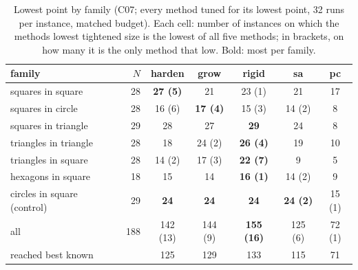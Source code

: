 \begin{table}[t]\centering\small
\begin{tabular}{lrccccc}
\toprule
family & $N$ & \textbf{harden} & \textbf{grow} & \textbf{rigid} & \textbf{sa} & \textbf{pc} \\
\midrule
squares in square & 28 & \textbf{27 (5)} & 21 & 23 (1) & 21 & 17 \\
squares in circle & 28 & 16 (6) & \textbf{17 (4)} & 15 (3) & 14 (2) & 8 \\
squares in triangle & 29 & 28 & 27 & \textbf{29} & 24 & 8 \\
triangles in triangle & 28 & 18 & 24 (2) & \textbf{26 (4)} & 19 & 10 \\
triangles in square & 28 & 14 (2) & 17 (3) & \textbf{22 (7)} & 9 & 5 \\
hexagons in square & 18 & 15 & 14 & \textbf{16 (1)} & 14 (2) & 9 \\
circles in square (control) & 29 & \textbf{24} & \textbf{24} & \textbf{24} & \textbf{24 (2)} & 15 (1) \\
\midrule
all & 188 & 142 (13) & 144 (9) & \textbf{155 (16)} & 125 (6) & 72 (1) \\
reached best known & & 125 & 129 & 133 & 115 & 71 \\
\bottomrule
\end{tabular}
\caption{Lowest point by family (C07; every method tuned for its lowest point, 32 runs per instance, matched budget). Each cell: number of instances on which the method\textquotesingle s lowest tightened size is the lowest of all five methods; in brackets, on how many it is the only method that low. Bold: most per family.}
\label{tab:main}
\end{table}
